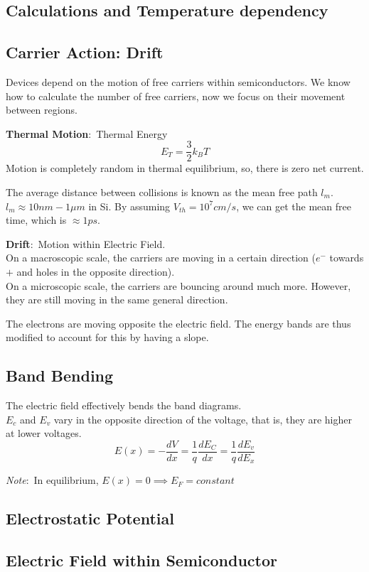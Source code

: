 \documentclass[nobib]{tufte-handout}
\newcommand{\defn}[2]{
        \begin{defbox}
        \noindent\textbf{#1}:\ #2
        \end{defbox}
}
\newcommand{\note}[1]{
        \begin{notebox}
        \noindent\textit{Note}:\ #1
        \end{notebox}
}
\begin{document}
\subsection*{Calculations and Temperature dependency}
\subsection{Carrier Action: Drift}
Devices depend on the motion of free carriers within semiconductors. We know how to calculate the number of free carriers, now we focus on their movement between regions.\\
\defn{Thermal Motion}{Thermal Energy
\begin{equation*}
    E_T = \frac{3}{2}k_B T
\end{equation*}
Motion is completely random in thermal equilibrium, so, there is zero net current.
}
The average distance between collisions is known as the mean free path $l_m$.
$l_m\approx 10nm - 1\mu m$ in Si. By assuming $V_{th} = 10^7 cm/s$, we can get the mean free time, which is $\approx 1ps$.\\
\defn{Drift}{Motion within Electric Field.\\
On a macroscopic scale, the carriers are moving in a certain direction ($e^-$ towards $+$ and holes in the opposite direction). \\
On a microscopic scale, the carriers are bouncing around much more. However, they are still moving in the same general direction.
}
The electrons are moving opposite the electric field. The energy bands are thus modified to account for this by having a slope.

\subsection{Band Bending}
The electric field effectively bends the band diagrams.\\
$E_c$ and $E_v$ vary in the opposite direction of the voltage, that is, they are higher at lower voltages.
\begin{equation*}
    E(x) = -\frac{dV}{dx} = \frac{1}{q}\frac{dE_C}{dx} = \frac{1}{q}\frac{dE_v}{dE_x}
\end{equation*}
\note{In equilibrium, $E(x) = 0 \implies E_F = constant$}
\subsection*{Electrostatic Potential}
\subsection*{Electric Field within Semiconductor}
\end{document}
